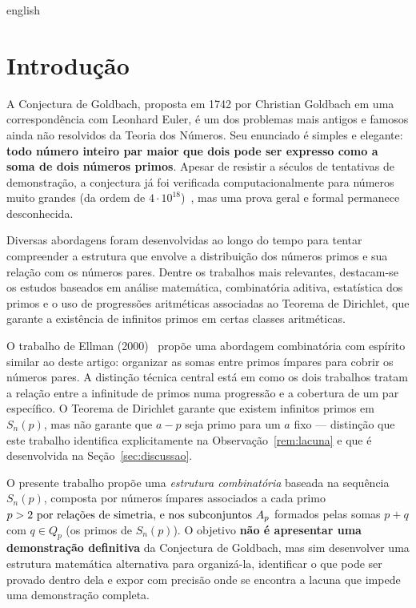 \documentclass[a4paper,11pt]{article}
\theoremstyle{definition}
\theoremstyle{remark}
\begin{document}
	\begin{otherlanguage*}{english}
		\section{Introdução}
		
		A Conjectura de Goldbach, proposta em 1742 por Christian Goldbach em uma
		correspondência com Leonhard Euler, é um dos problemas mais antigos e
		famosos ainda não resolvidos da Teoria dos Números. Seu enunciado é simples
		e elegante: \textbf{todo número inteiro par maior que dois pode ser expresso
			como a soma de dois números primos}. Apesar de resistir a séculos de
		tentativas de demonstração, a conjectura já foi verificada
		computacionalmente para números muito grandes (da ordem de
		\(4 \cdot 10^{18}\))~\cite{oliveira}, mas uma prova geral e formal permanece
		desconhecida.
		
		Diversas abordagens foram desenvolvidas ao longo do tempo para tentar
		compreender a estrutura que envolve a distribuição dos números primos e
		sua relação com os números pares. Dentre os trabalhos mais relevantes,
		destacam-se os estudos baseados em análise matemática, combinatória
		aditiva, estatística dos primos e o uso de progressões aritméticas
		associadas ao Teorema de Dirichlet, que garante a existência de infinitos
		primos em certas classes aritméticas.
		
		O trabalho de Ellman (2000)~\cite{Ellman2000} propõe uma abordagem
		combinatória com espírito similar ao deste artigo: organizar as somas entre
		primos ímpares para cobrir os números pares. A distinção técnica central
		está em como os dois trabalhos tratam a relação entre a infinitude de primos
		numa progressão e a cobertura de um par específico. O Teorema de Dirichlet
		garante que existem infinitos primos em $S_n(p)$, mas não garante que
		$a - p$ seja primo para um $a$ fixo — distinção que este trabalho identifica
		explicitamente na Observação~\ref{rem:lacuna} e que é desenvolvida na
		Seção~\ref{sec:discussao}.
		
		O presente trabalho propõe uma \emph{estrutura combinatória} baseada na
		sequência \(S_n(p)\), composta por números ímpares associados a cada primo
		\(p > 2$ por relações de simetria, e nos subconjuntos \(A_p\) formados pelas
		somas \(p + q\) com \(q \in Q_p\) (os primos de \(S_n(p)\)). O objetivo
		\textbf{não é apresentar uma demonstração definitiva} da Conjectura de
		Goldbach, mas sim desenvolver uma estrutura matemática alternativa para
		organizá-la, identificar o que pode ser provado dentro dela e expor
		com precisão onde se encontra a lacuna que impede uma demonstração completa.
		

\end{otherlanguage*}
\end{document}
